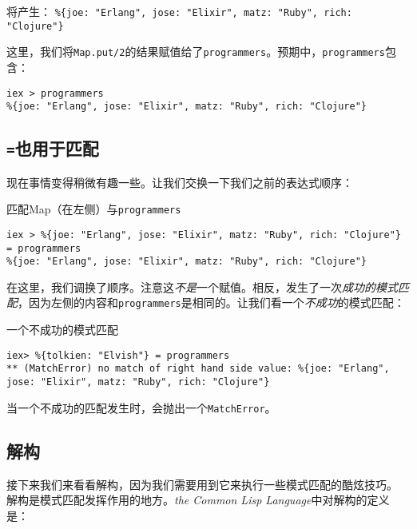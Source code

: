 将产生：
\texttt{\%\{joe: "Erlang", jose: "Elixir", matz: "Ruby", rich: "Clojure"\}}

这里，我们将\texttt{Map.put/2}的结果赋值给了\texttt{programmers}。预期中，\texttt{programmers}包含：

\begin{code}{}
\begin{verbatim}
iex > programmers
%{joe: "Erlang", jose: "Elixir", matz: "Ruby", rich: "Clojure"}
\end{verbatim}
\end{code}


\subsection{\texttt{=}也用于匹配}

现在事情变得稍微有趣一些。让我们交换一下我们之前的表达式顺序：

\begin{code}{匹配Map（在左侧）与\texttt{programmers}}
\begin{verbatim}
iex > %{joe: "Erlang", jose: "Elixir", matz: "Ruby", rich: "Clojure"} = programmers
%{joe: "Erlang", jose: "Elixir", matz: "Ruby", rich: "Clojure"}
\end{verbatim}
\label{lst:match_a_map_against_programmers}
\end{code}

在这里，我们调换了顺序。注意这\emph{不是}一个赋值。相反，发生了一次\emph{成功的模式匹配}，因为左侧的内容和\texttt{programmers}是相同的。让我们看一个\emph{不成功}的模式匹配：

\begin{code}{一个不成功的模式匹配}
\begin{verbatim}
iex> %{tolkien: "Elvish"} = programmers
** (MatchError) no match of right hand side value: %{joe: "Erlang", jose: "Elixir", matz: "Ruby", rich: "Clojure"}
\end{verbatim}
\label{lst:an_unsuccessful_pattern_match}
\end{code}
当一个不成功的匹配发生时，会抛出一个\texttt{MatchError}。

\subsection{解构}
接下来我们来看看解构，因为我们需要用到它来执行一些模式匹配的酷炫技巧。
解构是模式匹配发挥作用的地方。\emph{the Common Lisp Language}中对解构的定义是：

